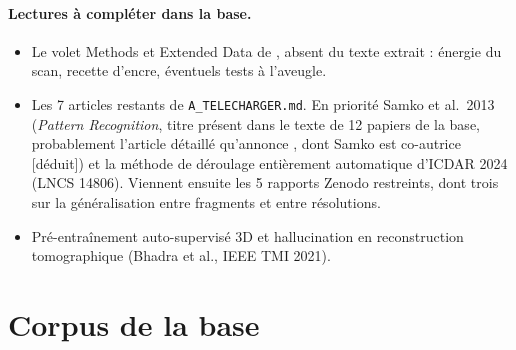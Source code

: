 \documentclass[11pt,a4paper]{article}
\newcommand{\deduit}{\textsf{\small[déduit]}}
\begin{document}
\paragraph{Lectures à compléter dans la base.}
\begin{itemize}
  \item Le volet Methods et Extended Data de \cite{angelotti2026complete}, absent du texte
  extrait : énergie du scan, recette d'encre, éventuels tests à l'aveugle.
  \item Les 7 articles restants de \nolinkurl{A_TELECHARGER.md}. En priorité Samko et al.\
  2013 (\emph{Pattern Recognition}, titre présent dans le texte de 12 papiers de la base,
  probablement l'article détaillé qu'annonce \cite{mills2012}, dont Samko est co-autrice
  \deduit) et la méthode de déroulage
  entièrement automatique d'ICDAR 2024 (LNCS 14806). Viennent ensuite les 5 rapports Zenodo
  restreints, dont trois sur la généralisation entre fragments et entre résolutions.
  \item Pré-entraînement auto-supervisé 3D et hallucination en reconstruction tomographique
  (Bhadra et al., IEEE TMI 2021).
\end{itemize}

\appendix
\section{Corpus de la base}
\label{sec:corpus}
\end{document}
